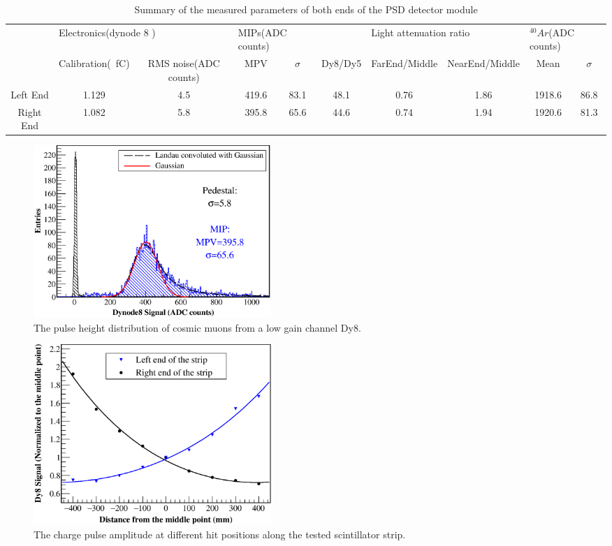 \documentclass[5p, times]{elsarticle}
\begin{document}
\begin{table}\footnotesize
	\centering
	\caption{Summary of the measured parameters of both ends of the PSD detector module}
	\label{tab:summary} 
\begin{tabular}{cccccccccc}
	\toprule
	&\multicolumn{2}{l}{Electronics(dynode 8 )}&\multicolumn{2}{l}{MIPs(ADC counts)}&\multicolumn{1}{l}{}&\multicolumn{2}{l}{Light attenuation ratio}&\multicolumn{2}{l}{$^{40}Ar$(ADC counts)} \\
	\cmidrule(r){2-3}\cmidrule(r){4-5}\cmidrule(r){7-8}\cmidrule(r){9-10}
	& Calibration(\si{\per\femto\coulomb}) & RMS noise(ADC counts) & MPV & $\sigma$ & Dy8/Dy5 & FarEnd/Middle & NearEnd/Middle & Mean & $\sigma$ \\
	\midrule 
	Left End & 1.129 & 4.5 & 419.6 & 83.1 & 48.1 & 0.76 & 1.86 & 1918.6 & 86.8 \\ 
	Right End & 1.082 & 5.8 & 395.8 & 65.6 & 44.6 & 0.74 & 1.94 & 1920.6 & 81.3 \\ 
	\bottomrule
\end{tabular}
\end{table}

\begin{figure}
	\centering
	\includegraphics[width=90mm]{mip}
	\caption{The pulse height distribution of cosmic muons from a low gain channel Dy8.}
	\label{fig:mip}
\end{figure} 

\begin{figure}
	\centering
	\includegraphics[width=90mm]{attenuation}
	\caption{The charge pulse amplitude at different hit positions along the tested scintillator strip.}
	\label{fig:attenuation}
\end{figure} 
\end{document}
